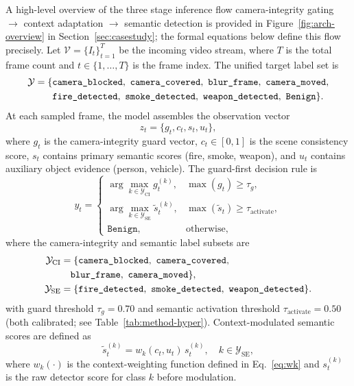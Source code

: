 \documentclass[a4paper,fleqn]{cas-dc}
\begin{document}
A high-level overview of the three stage inference flow  camera-integrity gating $\rightarrow$ context adaptation $\rightarrow$ semantic detection is provided in Figure~\ref{fig:arch-overview} in Section~\ref{sec:casestudy}; the formal equations below define this flow precisely. Let $\mathcal{V}=\{I_t\}_{t=1}^{T}$ be the incoming video stream, where $T$ is the total frame count and $t\in\{1,\ldots,T\}$ is the frame index. The unified target label set is
\begin{align}
\mathcal{Y}=\{&\texttt{camera\_blocked},\ \texttt{camera\_covered},\ \texttt{blur\_frame},\ \texttt{camera\_moved},\notag\\
              &\texttt{fire\_detected},\ \texttt{smoke\_detected},\ \texttt{weapon\_detected},\ \texttt{Benign}\}.\notag
\end{align}
At each sampled frame, the model assembles the observation vector
\begin{equation}
z_t=\{g_t,c_t,s_t,u_t\},
\end{equation}
where $g_t$ is the camera-integrity guard vector, $c_t\in[0,1]$ is the scene consistency score, $s_t$ contains primary semantic scores (fire, smoke, weapon), and $u_t$ contains auxiliary object evidence (person, vehicle). The guard-first decision rule is
\begin{equation}
y_t=
\begin{cases}
\arg\max\limits_{k\in\mathcal{Y}_{\text{CI}}} g_t^{(k)}, & \max(g_t)\ge \tau_g,\\
\arg\max\limits_{k\in\mathcal{Y}_{\text{SE}}}\tilde{s}_t^{(k)}, & \max(\tilde{s}_t)\ge \tau_{\text{activate}},\\
\texttt{Benign}, & \text{otherwise},
\end{cases}
\end{equation}
where the camera-integrity and semantic label subsets are
\begin{align}
\mathcal{Y}_{\text{CI}}&=\{\texttt{camera\_blocked},\ \texttt{camera\_covered},\notag\\
&\quad\texttt{blur\_frame},\ \texttt{camera\_moved}\},\notag\\
\mathcal{Y}_{\text{SE}}&=\{\texttt{fire\_detected},\ \texttt{smoke\_detected},\ \texttt{weapon\_detected}\}.\notag
\end{align}
with guard threshold $\tau_g=0.70$ and semantic activation threshold $\tau_{\text{activate}}=0.50$ (both calibrated; see Table~\ref{tab:method-hyper}). Context-modulated semantic scores are defined as
\begin{equation}
\label{eq:wk-weight}
\tilde{s}_t^{(k)}=w_k(c_t,u_t)\,s_t^{(k)}, \quad k\in\mathcal{Y}_{\text{SE}},
\end{equation}
where $w_k(\cdot)$ is the context-weighting function defined in Eq.~\eqref{eq:wk} and $s_t^{(k)}$ is the raw detector score for class $k$ before modulation.
 
\end{document}
